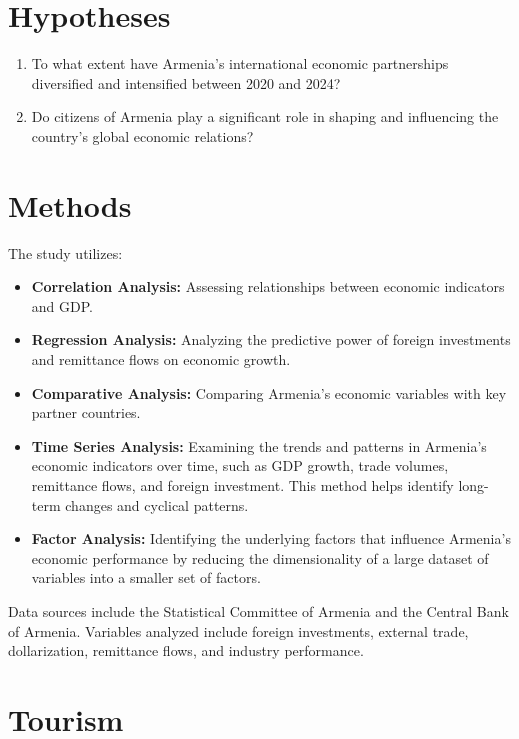 \documentclass[
]{article}
\providecommand{\tightlist}{%
  \setlength{\itemsep}{0pt}\setlength{\parskip}{0pt}}
\begin{document}
\section{Hypotheses}\label{hypotheses}

\begin{enumerate}
\def\labelenumi{\arabic{enumi}.}
\tightlist
\item
  To what extent have Armenia's international economic partnerships
  diversified and intensified between 2020 and 2024?
\item
  Do citizens of Armenia play a significant role in shaping and
  influencing the country's global economic relations?
\end{enumerate}

\newpage

\section{Methods}\label{methods}

The study utilizes:

\begin{itemize}
\tightlist
\item
  \textbf{Correlation Analysis:} Assessing relationships between
  economic indicators and GDP.
\item
  \textbf{Regression Analysis:} Analyzing the predictive power of
  foreign investments and remittance flows on economic growth.
\item
  \textbf{Comparative Analysis:} Comparing Armenia's economic variables
  with key partner countries.
\item
  \textbf{Time Series Analysis:} Examining the trends and patterns in
  Armenia's economic indicators over time, such as GDP growth, trade
  volumes, remittance flows, and foreign investment. This method helps
  identify long-term changes and cyclical patterns.
\item
  \textbf{Factor Analysis:} Identifying the underlying factors that
  influence Armenia's economic performance by reducing the
  dimensionality of a large dataset of variables into a smaller set of
  factors.
\end{itemize}

Data sources include the Statistical Committee of Armenia and the
Central Bank of Armenia. Variables analyzed include foreign investments,
external trade, dollarization, remittance flows, and industry
performance.

\section{Tourism}\label{tourism}
\end{document}
